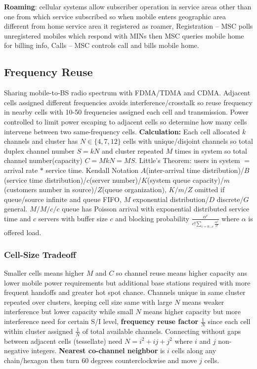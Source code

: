 \documentclass[9pt]{extarticle}
\begin{document}
\begin{multicols}{2}
\textbf{Roaming}: cellular systems allow subscriber operation in service areas other than one from which service subscribed so when mobile enters geographic area different from home service area it registered as roamer, Registration – MSC polls unregistered mobiles which respond with MINs then MSC queries mobile home for billing info, Calls – MSC controls call and bills mobile home.

\subsection{Frequency Reuse}

Sharing mobile-to-BS radio spectrum with FDMA/TDMA and CDMA. Adjacent cells assigned different frequencies avoids interference/crosstalk so reuse frequency in nearby cells with 10-50 frequencies assigned each cell and transmission. Power controlled to limit power escaping to adjacent cells so determine how many cells intervene between two same-frequency cells. \textbf{Calculation:} Each cell allocated $k$ channels and cluster has $N\in\{4,7,12\}$ cells with unique/disjoint channels so total duplex channel number $S = kN$ and cluster repeated $M$ times in system so total channel number(capacity) $C = MkN = MS$. Little’s Theorem: users in system $=$ arrival rate $*$ service time. Kendall Notation $A$(inter-arrival time distribution)/$B$(service time distribution)/$c$(server number)/$K$(system queue capacity)/$m$(customers number in source)/$Z$(queue organization), $K/m/Z$ omitted if queue/source infinite and queue FIFO, $M$ exponential distribution/$D$ discrete/$G$ general. $M/M/c/c$ queue has Poisson arrival with exponential distributed service time and $c$ servers with buffer size $c$ and blocking probability $\frac{\alpha^c}{c!\sum_{i=0\dots{c}}\frac{\alpha^i}{i!}}$ where $\alpha$ is offered load. 

\subsubsection{Cell-Size Tradeoff}

Smaller cells means higher $M$ and $C$ so channel reuse means higher capacity ans lower mobile power requirements but additional base stations required with more frequent handoffs and greater hot spot chance. Channels unique in same cluster repeated over clusters, keeping cell size same with large $N$ means weaker interference but lower capacity while small $N$ means higher capacity but more interference need for certain S/I level, \textbf{frequency reuse factor} $\frac{1}{N}$ since each cell within cluster assigned $\frac{1}{N}$ of total available channels. Connecting without gaps between adjacent cells (tessellate) need $N=i^2+ij+j^2$ where $i$ and $j$ non-negative integers. \textbf{Nearest co-channel neighbor} is $i$ cells along any chain/hexagon then turn 60 degrees counterclockwise and move $j$ cells.


\end{multicols}
\end{document}
